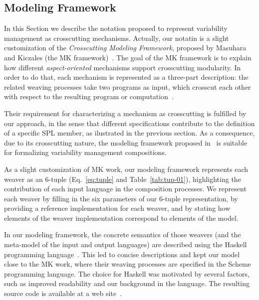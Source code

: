 
\subsection{Modeling Framework}\label{sub:modeling-framework}

In this Section we describe the notation proposed to represent variability
management as crosscutting mechanisms. Actually, our notatin is a slight
customization of the \emph{Crosscutting Modeling Framework}, proposed by Masuhara
and Kiczales (the MK framework)~\cite{Masuhara:2003aa}. The goal of the MK
framework is to explain how different \emph{aspect-oriented} mechanisms support
crosscutting modularity. In order to do that, each mechanism is represented as a
three-part description: the related weaving processes take two programs as input,
which crosscut each other with respect to the resulting program or
computation~\cite{Masuhara:2003aa}.

Their requirement for characterizing a mechanism as crosscutting is fulfilled by
our approach, in the sense that different specifications contribute to the
definition of a specific SPL member, as ilustrated in the previous section. As a
consequence, due to its crosscutting nature, the modeling framework proposed
in~\cite{Masuhara:2003aa} is suitable for formalizing variability management
compositions.

As a slight customization of MK work, our modeling framework represents each
weaver as an 6-tuple (Eq.~\ref{eq:tuple} and Table~\ref{tab:tup-01}),
highlighting the contribution of each input language in the composition
processes. We represent each weaver by filling in the six parameters of our
6-tuple representation, by providing a reference implementation for each weaver,
and by stating how elements of the weaver implementation correspond to elements
of the model.

In our modeling framework, the concrete semantics of those weavers (and the
meta-model of the input and output languages) are described using the Haskell
programming language~\cite{Jones:2002aa}. This led to concise descriptions and
kept our model close to the MK work, where their weaving processes are specified
in the Scheme programming language. The choice for Haskell was motivated by
several factors, such as improved readability and our background in the language.
The resulting source code is available at a web site~\cite{SPG:site}.

